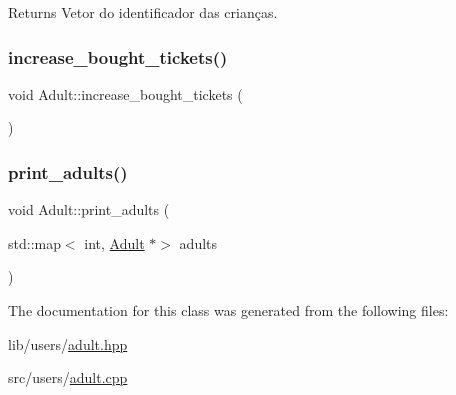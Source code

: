 \begin{DoxyReturn}{Returns}
Vetor do identificador das crianças. 
\end{DoxyReturn}
\mbox{\label{class_adult_a8794550316d53d3fc79875e2001b25e0}} 
\subsubsection{\texorpdfstring{increase\+\_\+bought\+\_\+tickets()}{increase\_bought\_tickets()}}
{\footnotesize\ttfamily void Adult\+::increase\+\_\+bought\+\_\+tickets (\begin{DoxyParamCaption}{ }\end{DoxyParamCaption})\hspace{0.3cm}{\ttfamily [inline]}}

\mbox{\label{class_adult_aba53ce7a7ecab6b473f0226002da9972}} 
\subsubsection{\texorpdfstring{print\+\_\+adults()}{print\_adults()}}
{\footnotesize\ttfamily void Adult\+::print\+\_\+adults (\begin{DoxyParamCaption}\item[{std\+::map$<$ int, \hyperlink{class_adult}{Adult} $\ast$$>$}]{adults }\end{DoxyParamCaption})\hspace{0.3cm}{\ttfamily [static]}}



The documentation for this class was generated from the following files\+:\begin{DoxyCompactItemize}
\item 
lib/users/\hyperlink{adult_8hpp}{adult.\+hpp}\item 
src/users/\hyperlink{adult_8cpp}{adult.\+cpp}\end{DoxyCompactItemize}
